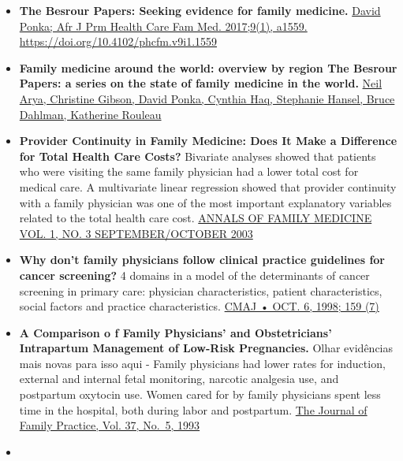 \documentclass[]{book}
\begin{document}
\begin{itemize}
\item
  \textbf{The Besrour Papers: Seeking evidence for family medicine.} \href{https://phcfm.org/index.php/phcfm/article/view/1559/2228}{David Ponka; Afr J Prm Health Care Fam Med. 2017;9(1), a1559. https://doi.org/10.4102/phcfm.v9i1.1559}
\item
  \textbf{Family medicine around the world: overview by region The Besrour Papers: a series on the state of family medicine in the world.} \href{https://www.ncbi.nlm.nih.gov/pmc/articles/PMC5471080/pdf/0630436.pdf}{Neil Arya, Christine Gibson, David Ponka, Cynthia Haq, Stephanie Hansel, Bruce Dahlman, Katherine Rouleau}
\item
  \textbf{Provider Continuity in Family Medicine: Does It Make a Difference for Total Health Care Costs?} Bivariate analyses showed that patients who were visiting the same family physician had a lower total cost for medical care. A multivariate linear regression showed that provider continuity with a family physician was one of the most important explanatory variables related to the total health care cost. \href{https://www.ncbi.nlm.nih.gov/pmc/articles/PMC1466579/pdf/0010144.pdf}{ANNALS OF FAMILY MEDICINE VOL. 1, NO. 3 SEPTEMBER/OCTOBER 2003}
\item
  \textbf{Why don't family physicians follow clinical practice guidelines for cancer screening?} 4 domains in a model of the determinants of cancer screening in primary care: physician characteristics, patient characteristics, social factors and practice characteristics. \href{https://www.ncbi.nlm.nih.gov/pmc/articles/PMC1232738/pdf/cmaj_159_7_797.pdf}{CMAJ • OCT. 6, 1998; 159 (7)}
\item
  \textbf{A Comparison o f Family Physicians' and Obstetricians' Intrapartum Management of Low-Risk Pregnancies.} Olhar evidências mais novas para isso aqui - Family physicians had lower rates for induction, external and internal fetal monitoring, narcotic analgesia use, and postpartum oxytocin use. Women cared for by family physicians spent less time in the hospital, both during labor and postpartum. \href{https://mdedge-files-live.s3.us-east-2.amazonaws.com/files/s3fs-public/jfp-archived-issues/1993-volume_36-37/JFP_1993-11_v37_i5_a-comparison-of-family-physicians-and-o.pdf}{The Journal of Family Practice, Vol. 37, No.~5, 1993}
\item

\end{itemize}
\end{document}
